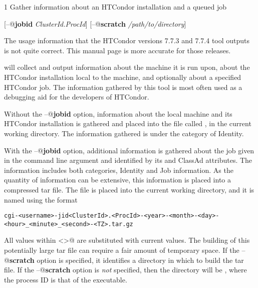 \begin{ManPage}{\label{man-condor-gather-info}}{1}
{Gather information about an HTCondor installation and a queued job}
\Synopsis

[\verb@--@\textbf{jobid} \textit{ClusterId.ProcId}]
[\verb@--@\textbf{scratch} \textit{/path/to/directory}]


\Description

\Note  The usage information that the 
HTCondor versions 7.7.3 and 7.7.4  tool outputs
is not quite correct.
This manual page is more accurate for those releases.

 will collect and output information 
about the machine it is run upon,
about the HTCondor installation local to the machine, 
and optionally about a specified HTCondor job. 
The information gathered by this tool is most often used as a debugging aid
for the developers of HTCondor.

Without the \verb@--@\textbf{jobid} option, information about the
local machine and its HTCondor installation is gathered and
placed into the file called ,
in the current working directory. 
The information gathered is under the category of Identity.

With the \verb@--@\textbf{jobid} option, 
additional information is gathered about the job given
in the command line argument and identified by
its  and  ClassAd attributes.
The information includes both categories, 
Identity and Job information.
As the quantity of information can be extensive,
this information is placed into a compressed tar file.
The file is placed into the current working directory,
and it is named using the format
\footnotesize
\begin{verbatim}
cgi-<username>-jid<ClusterId>.<ProcId>-<year>-<month>-<day>-<hour>_<minute>_<second>-<TZ>.tar.gz
\end{verbatim}
\normalsize
All values within \verb@<>@ are substituted with current values.
The building of this potentially large tar file can require a fair
amount of temporary space.
If the \verb@--@\textbf{scratch} option is specified,
it identifies a directory in which to build the tar file.
If the \verb@--@\textbf{scratch} option is \emph{not} specified, 
then the directory will be ,
where the process ID is that of the  executable.


\end{ManPage}
